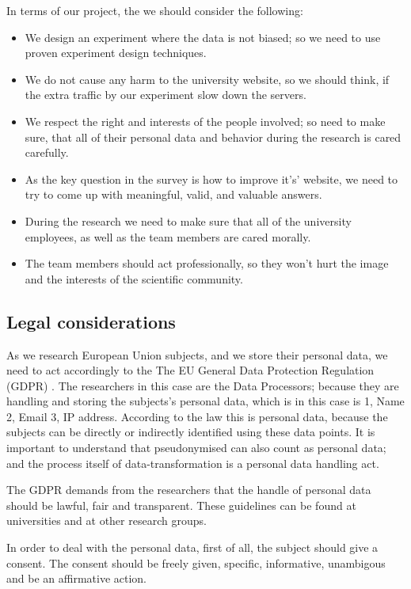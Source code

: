 \documentclass[12pt,a4paper,paper=a4,oneside,titlepage,pdftex]{scrartcl}
\begin{document}
In terms of our project, the we should consider the following:
\begin{itemize}
	\item We design an experiment where the data is not biased; so we need to use proven experiment design techniques.
	\item We do not cause any harm to the university website, so we should think, if the extra traffic by our experiment slow down the servers.
	\item We respect the right and interests of the people involved; so need to make sure, that all of their personal data and behavior during the research is cared carefully.
	\item As the key question in the survey is how to improve it's' website, we need to try to come up with meaningful, valid, and valuable answers.
	\item During the research we need to make sure that all of the university employees, as well as the team members are cared morally.
	\item The team members should act professionally, so they won't hurt the image and the interests of the scientific community.
\end{itemize}

\subsection{Legal considerations}

As we research European Union subjects, and we store their personal data, we need to act accordingly to the The EU General Data Protection Regulation (GDPR) \citep{voigt2017eu}. The researchers in this case are the Data Processors; because they are handling and storing the subjects's personal data, which is in this case is 1, Name 2, Email 3, IP address. According to the law this is personal data, because the subjects can be directly or indirectly identified using these data points. It is important to understand that pseudonymised can also count as personal data; and the process itself of data-transformation is a personal data handling act.

The GDPR demands from the researchers that the handle of personal data should be lawful, fair and transparent. These guidelines can be found at universities and at other research groups.

In order to deal with the personal data, first of all, the subject should give a consent. The consent should be freely given, specific, informative, unambigous and be an affirmative action.
\end{document}

